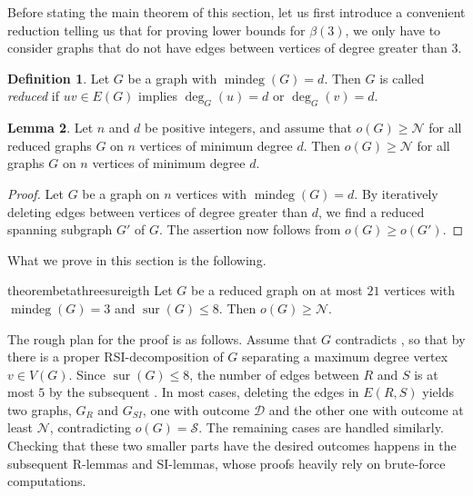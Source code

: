 \documentclass[a4paper,11pt,oneside]{scrartcl}
\theoremstyle{definition}
\newtheorem{definition}{Definition}
\newtheorem{lemma}[definition]{Lemma}
\theoremstyle{remark}
\DeclareMathOperator{\mindeg}{mindeg}
\DeclareMathOperator{\sur}{sur}
\begin{document}
Before stating the main theorem of this section, let us first introduce a convenient reduction telling us that for proving lower bounds for $\beta(3)$, we only have to consider graphs that do not have edges between vertices of degree greater than $3$.

\begin{definition}
    Let $G$ be a graph with $\mindeg(G) = d$. Then $G$ is called \emph{reduced} if $uv \in E(G)$ implies $\deg_G(u) = d$ or $\deg_G(v) = d$.
\end{definition}

\begin{lemma}\label{lemma:reduction_to_reduced_graphs}
    Let $n$ and $d$ be positive integers, and assume that $o(G) \geq \mathcal N$ for all reduced graphs $G$ on $n$ vertices of minimum degree $d$. Then $o(G) \geq \mathcal N$ for all graphs $G$ on $n$ vertices of minimum degree $d$.
\end{lemma}
\begin{proof}
    Let $G$ be a graph on $n$ vertices with $\mindeg(G) = d$. By iteratively deleting edges between vertices of degree greater than $d$, we find a reduced spanning subgraph $G'$ of $G$. The assertion now follows from $o(G) \geq o(G')$.
\end{proof}

What we prove in this section is the following.

\begin{restatable}{theorem}{betathreesureigth}\label{theorem:beta_3_for_sur_8}
    Let $G$ be a reduced graph on at most $21$ vertices with $\mindeg(G) = 3$ and $\sur(G) \leq 8$. Then $o(G) \geq \mathcal N$. 
\end{restatable}

The rough plan for the proof is as follows. Assume that $G$ contradicts , so that by  there is a proper RSI-decomposition of $G$ separating a maximum degree vertex $v \in V(G)$. Since $\sur(G)\leq 8$, the number of edges between $R$ and $S$ is at most $5$ by the subsequent . In most cases, deleting the edges in $E(R,S)$ yields two graphs, $G_R$ and $G_{SI}$, one with outcome $\mathcal D$ and the other one with outcome at least $\mathcal N$, contradicting $o(G) = \mathcal S$. The remaining cases are handled similarly. Checking that these two smaller parts have the desired outcomes happens in the subsequent R-lemmas and SI-lemmas, whose proofs heavily rely on brute-force computations.
\end{document}
